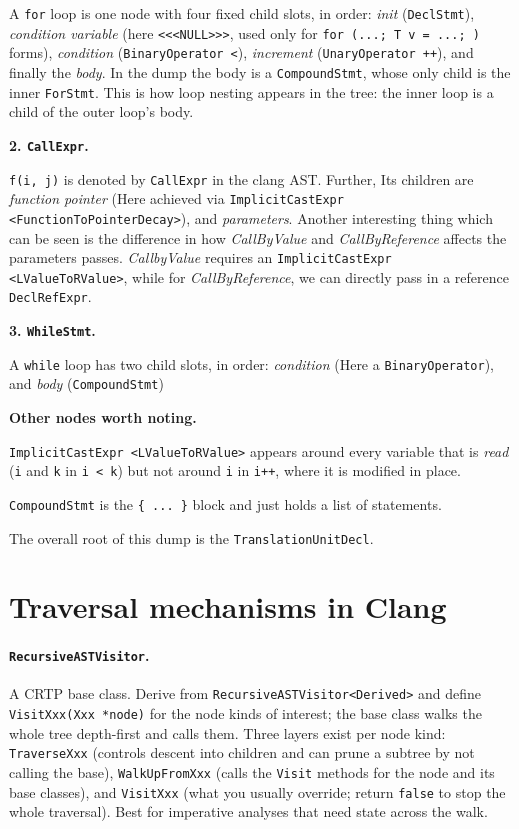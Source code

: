 \documentclass[11pt,a4paper]{article}
\begin{document}
A \texttt{for} loop is one node with four fixed child slots, in order: \emph{init} (\texttt{DeclStmt}), \emph{condition variable} (here \texttt{<<<NULL>>>}, used only for \texttt{for (...; T v = ...; )} forms), \emph{condition} (\texttt{BinaryOperator <}), \emph{increment} (\texttt{UnaryOperator ++}), and finally the \emph{body}. In the dump the body is a \texttt{CompoundStmt}, whose only child is the inner \texttt{ForStmt}. This is how loop nesting appears in the tree: the inner loop is a child of the outer loop's body.

\textbf{2. \texttt{CallExpr}.}

\texttt{f(i, j)} is denoted by \texttt{CallExpr} in the clang AST. Further, Its children are \emph{function pointer} (Here achieved via \texttt{ImplicitCastExpr <FunctionToPointerDecay>}), and \emph{parameters}.
Another interesting thing which can be seen is the difference in how \emph{CallByValue} and \emph{CallByReference} affects the parameters passes. \emph{CallbyValue} requires an \texttt{ImplicitCastExpr <LValueToRValue>}, while for \emph{CallByReference}, we can directly pass in a reference \texttt{DeclRefExpr}.

\textbf{3. \texttt{WhileStmt}.}

A \texttt{while} loop has two child slots, in order: \emph{condition} (Here a \texttt{BinaryOperator}), and \emph{body} (\texttt{CompoundStmt})

\textbf{Other nodes worth noting.}

\texttt{ImplicitCastExpr <LValueToRValue>} appears around every variable that is \emph{read} (\texttt{i} and \texttt{k} in \texttt{i < k}) but not around \texttt{i} in \texttt{i++}, where it is modified in place.

\texttt{CompoundStmt} is the \texttt{\{ ... \}} block and just holds a list of statements.

The overall root of this dump is the \texttt{TranslationUnitDecl}.

\section{Traversal mechanisms in Clang}

\paragraph{\texttt{RecursiveASTVisitor}.}
A CRTP base class. Derive from \texttt{RecursiveASTVisitor<Derived>} and define \texttt{VisitXxx(Xxx *node)} for the node kinds of interest; the base class walks the whole tree depth-first and calls them. Three layers exist per node kind: \texttt{TraverseXxx} (controls descent into children and can prune a subtree by not calling the base), \texttt{WalkUpFromXxx} (calls the \texttt{Visit} methods for the node and its base classes), and \texttt{VisitXxx} (what you usually override; return \texttt{false} to stop the whole traversal). Best for imperative analyses that need state across the walk.
\end{document}
